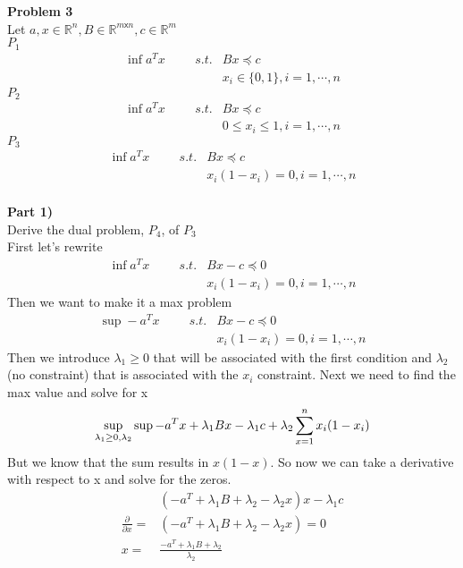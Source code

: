 \documentclass[12pt,letter]{article}
\newcommand{\problem}[1]{\vspace{3mm}\Large\textbf{{Problem {#1}\vspace{3mm}}}\normalsize\\}
\newcommand{\ppart}[1]{\vspace{2mm}\large\textbf{\\Part {#1})\vspace{2mm}}\normalsize\\}
\begin{document}
\problem{3}
Let $a,x\in\mathbb{R}^n, B\in\mathbb{R}^{m\textsf{x}n}, c\in\mathbb{R}^m$
\\
$P_1$
\begin{align*}
    \inf a^T x \hspace{1cm}
    s.t. & Bx \preceq c \\
         & x_i\in\{0,1\},i=1,\cdots,n
\end{align*}
$P_2$
\begin{align*}
    \inf a^T x \hspace{1cm}
    s.t. & Bx \preceq c \\
         & 0 \leq x_i \leq 1,i=1,\cdots,n
\end{align*}
$P_3$
\begin{align*}
    \inf a^T x \hspace{1cm}
    s.t. & Bx \preceq c \\
         & x_i(1-x_i) = 0,i=1,\cdots,n
\end{align*}
\ppart{1}
Derive the dual problem, $P_4$, of $P_3$
\\
First let's rewrite
\begin{align*}
    \inf a^T x \hspace{1cm}
    s.t. & Bx -c \preceq 0 \\
         & x_i(1-x_i) = 0,i=1,\cdots,n
\end{align*}
Then we want to make it a max problem
\begin{align*}
    \sup -a^T x \hspace{1cm}
    s.t. & Bx -c \preceq 0 \\
         & x_i(1-x_i) = 0,i=1,\cdots,n
\end{align*}
Then we introduce $\lambda_1\geq0$ that will be associated with the first condition
and $\lambda_2$ (no constraint) that is associated with the $x_i$ constraint. 
Next we need to find the max value and solve for x
\[
    \sup\limits_{\lambda_1\geq 0,\lambda_2}\sup -a^Tx + \lambda_1Bx - \lambda_1c
    + \lambda_2\sum\limits_{x=1}^nx_i(1-x_i) \\
\]
But we know that the sum results in $x(1-x)$. So now we can take a derivative
with respect to x and solve for the zeros. 
\begin{align*}
    &(-a^T + \lambda_1B + \lambda_2 - \lambda_2x)x - \lambda_1 c \\
    \frac{\partial}{\partial x} = &(-a^T + \lambda_1B + \lambda_2 - \lambda_2x) = 0\\
    x = &\frac{-a^T + \lambda_1 B + \lambda_2}{\lambda_2}
\end{align*}
\end{document}
